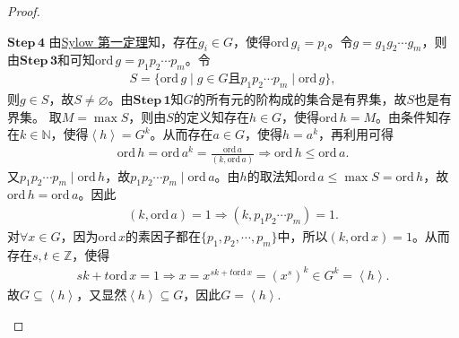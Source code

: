 \documentclass[../../main.tex]{subfiles}%
\begin{document}
\begin{proof}
\begin{enumerate}[(1)]
$\mathbf{Step\,4}$ 由\hyperref[theorem:Sylow 第一定理]{Sylow 第一定理}知，存在$g_i\in G$，使得$\mathrm{ord}\,g_i=p_i$。令$g=g_1g_2\cdots g_m$，则由$\mathbf{Step\,3}$和可知$\mathrm{ord}\,g=p_1p_2\cdots p_m$。令
\begin{align*}
S=\{ \mathrm{ord}\,g\mid g\in G\text{且}p_1p_2\cdots p_m\mid \mathrm{ord}\,g \},
\end{align*}
则$g\in S$，故$S\ne\varnothing$。由$\mathbf{Step\,1}$知$G$的所有元的阶构成的集合是有界集，故$S$也是有界集。
取$M=\max S$，则由$S$的定义知存在$h\in G$，使得$\mathrm{ord}\,h=M$。由条件知存在$k\in\mathbb{N}$，使得$\left< h \right> =G^k$。从而存在$a\in G$，使得$h=a^k$，再利用可得
\begin{align*}
\mathrm{ord}\,h=\mathrm{ord}\,a^k=\frac{\mathrm{ord}\,a}{(k,\mathrm{ord}\,a)}\Longrightarrow \mathrm{ord}\,h\leqslant \mathrm{ord}\,a.
\end{align*}
又$p_1p_2\cdots p_m\mid \mathrm{ord}\,h$，故$p_1p_2\cdots p_m\mid \mathrm{ord}\,a$。由$h$的取法知$\mathrm{ord}\,a\leqslant \max S=\mathrm{ord}\,h$，故$\mathrm{ord}\,h=\mathrm{ord}\,a$。因此
\begin{align*}
(k,\mathrm{ord}\,a)=1\Longrightarrow (k,p_1p_2\cdots p_m)=1.
\end{align*}
对$\forall x\in G$，因为$\mathrm{ord}\,x$的素因子都在$\{ p_1,p_2,\cdots,p_m \}$中，所以$(k,\mathrm{ord}\,x)=1$。从而存在$s,t\in\mathbb{Z}$，使得
\begin{align*}
sk+t\mathrm{ord}\,x=1\Longrightarrow x=x^{sk+t\mathrm{ord}\,x}=(x^s)^k\in G^k=\left< h \right>.
\end{align*}
故$G\subseteq\left< h \right>$，又显然$\left< h \right>\subseteq G$，因此$G=\left< h \right>$.

\end{enumerate}

\end{proof}
\end{document}
